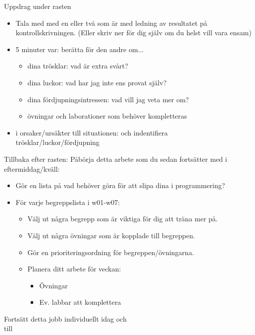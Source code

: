 \begin{Slide}{Uppdrag under rasten}
\begin{itemize}
\item Tala med med en eller två som är  med ledning av resultatet på kontrollskrivningen. (Eller skriv ner för dig själv om du helst vill vara ensam)

\item 5 minuter var: berätta för den andre om... 
\begin{itemize}
 \item dina trösklar: vad är extra svårt?
 \item dina luckor: vad har jag inte ens provat själv?
 \item dina fördjupningsintressen: vad vill jag veta mer om?
 \item övningar och laborationer som behöver kompletteras
\end{itemize}
\item {} i orsaker/ursäkter till situationen:  och  indentifiera trösklar/luckor/fördjupning
\end{itemize}
\end{Slide}


\begin{Slide}{Tillbaka efter rasten:}
Påbörja detta arbete som du sedan fortsätter med i eftermiddag/kväll:  
\begin{itemize}
\item Gör en lista på vad  behöver göra för att slipa dina  i programmering?
\item För varje begreppslista i w01-w07:
\begin{itemize}
\item Välj ut några begrepp som är viktiga för dig att träna mer på.
\item Välj ut några övningar som är kopplade till begreppen.
\item Gör en prioriteringsordning för begreppen/övningarna.
\item Planera ditt arbete för veckan:
\begin{itemize}
\item Övningar
\item Ev. labbar att komplettera
\end{itemize}
\end{itemize}
\end{itemize}
Fortsätt detta jobb individuellt idag och\\
 till \\ 
\end{Slide}

